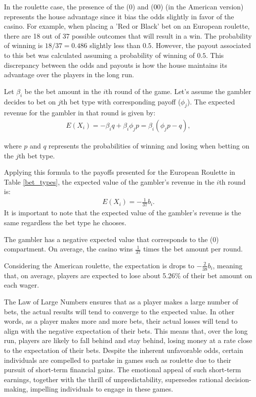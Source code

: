 \documentclass[11pt,twoside]{article}
\numberwithin{Theorem}{section}
\numberwithin{Definition}{section}
\numberwithin{Lemma}{section}
\numberwithin{Algorithm}{section}
\numberwithin{equation}{section}
\begin{document}
In the roulette case, the presence of the (0) and (00) (in the American version) represents the house advantage since it bias the odds slightly in favor of the casino. For example,  when placing a 'Red or Black' bet on an European roulette, there are 18 out of 37 possible outcomes that will result in a win. The probability of winning is $18/37 = 0.486$ slightly less than $0.5$. However, the payout associated to this bet was calculated assuming a probability of winning of $0.5$. This discrepancy between the odds and payouts is how the house maintains its advantage over the players in the long run.

Let $\beta_{i}$ be the bet amount in the $i$th round of the game. Let's assume the gambler decides to bet on $j$th bet type with corresponding payoff ($\phi_j$). The expected revenue for the gambler in that round is given by:
\begin{eqnarray}
E(X_{i}) = -\beta_{i}q + \beta_{i} \phi_{j} p  = \beta_{i} (\phi_{j} p - q), \label{expected_value}
\end{eqnarray}

where $p$ and $q$ represents the probabilities of winning and losing when betting on the $j$th bet type.

Applying this formula to the payoffs presented for the European Roulette in Table \ref{bet_types}, the expected value of the gambler's revenue in the $i$th round is:
\begin{eqnarray*}
    E(X_{i}) =  -\frac{1}{37}b_{i}. 
\end{eqnarray*}
It is important to note that the expected value of the gambler's revenue is the same regardless the bet type he chooses. 

The gambler has a negative expected value that corresponds to the (0) compartment. On average, the casino wins $\frac{1}{37}$ times the bet amount per round.

Considering the American roulette, the expectation is drops to $-\frac{2}{38}b_{i}$, meaning that, on average, players are expected to lose about 5.26\% of their bet amount on each wager. 

The Law of Large Numbers ensures that as a player makes a large number of bets, the actual results will tend to converge to the expected value. In other words, as a player makes more and more bets, their actual losses will tend to align with the negative expectation of their bets. This means that, over the long run, players are likely to fall behind and stay behind, losing money at a rate close to the expectation of their bets.
Despite the inherent unfavorable odds, certain individuals are compelled to partake in games such as roulette due to their pursuit of short-term financial gains. The emotional appeal of such short-term earnings, together with the thrill of unpredictability, supersedes rational decision-making, impelling individuals to engage in these games.
\end{document}
